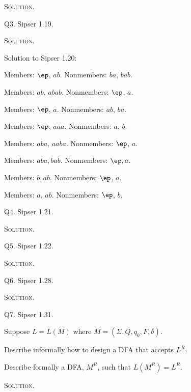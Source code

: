 \textsc{Solution}.



\newpage
Q3. Sipser 1.19.

\textsc{Solution}.



\newpage

Solution to Sipser 1.20:

\begin{myenum}
\item Members: $\ep$, $ab$. Nonmembers: $ba$, $bab$.
\item Members: $ab$, $abab$. Nonmembers: $\ep$, $a$.
\item Members: $\ep$, $a$. Nonmembers: $ab$, $ba$.
\item Members: $\ep$, $aaa$. Nonmembers: $a$, $b$.
\item Members: $aba$, $aaba$. Nonmembers: $\ep$, $a$.
\item Members: $aba, bab$. Nonmembers: $\ep, a$.
\item Members: $b, ab$. Nonmembers: $\ep$, $a$.
\item Members: $a$, $ab$. Nonmembers: $\ep$, $b$.
\end{myenum}

\newpage
Q4. Sipser 1.21.

\textsc{Solution}.



\newpage
Q5. Sipser 1.22.

\textsc{Solution}.



\newpage
Q6. Sipser 1.28.

\textsc{Solution}.



\newpage
Q7. Sipser 1.31.

Suppose $L = L(M)$ where $M = (\Sigma, Q, q_0, F, \delta).$

\begin{myenum}
\item Describe informally how to design a DFA that accepts $L^R$.
\item Describe formally a DFA, $M^R$, such that $L(M^R) = L^R$.
\end{myenum}

\textsc{Solution}.




